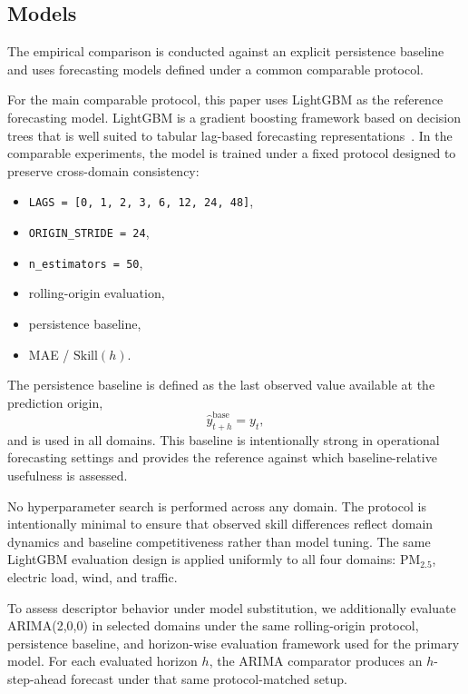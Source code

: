 \documentclass[11pt]{article}
\begin{document}
\subsection{Models}

The empirical comparison is conducted against an explicit persistence baseline and uses forecasting models defined under a common comparable protocol.

For the main comparable protocol, this paper uses LightGBM as the reference forecasting model. LightGBM is a gradient boosting framework based on decision trees that is well suited to tabular lag-based forecasting representations~\cite{ke2017lightgbm}. In the comparable experiments, the model is trained under a fixed protocol designed to preserve cross-domain consistency:
\begin{itemize}
  \item \texttt{LAGS = [0, 1, 2, 3, 6, 12, 24, 48]},
  \item \texttt{ORIGIN\_STRIDE = 24},
  \item \texttt{n\_estimators = 50},
  \item rolling-origin evaluation,
  \item persistence baseline,
  \item MAE / $\mathrm{Skill}(h)$.
\end{itemize}

The persistence baseline is defined as the last observed value available at the prediction origin,
\begin{equation}
\hat{y}^{\mathrm{base}}_{t+h} = y_t,
\end{equation}
and is used in all domains. This baseline is intentionally strong in operational forecasting settings and provides the reference against which baseline-relative usefulness is assessed.

No hyperparameter search is performed across any domain. The protocol is intentionally minimal to ensure that observed skill differences reflect domain dynamics and baseline competitiveness rather than model tuning. The same LightGBM evaluation design is applied uniformly to all four domains: PM$_{2.5}$, electric load, wind, and traffic.

To assess descriptor behavior under model substitution, we additionally evaluate ARIMA(2,0,0) in selected domains under the same rolling-origin protocol, persistence baseline, and horizon-wise evaluation framework used for the primary model. For each evaluated horizon $h$, the ARIMA comparator produces an $h$-step-ahead forecast under that same protocol-matched setup.
\end{document}
